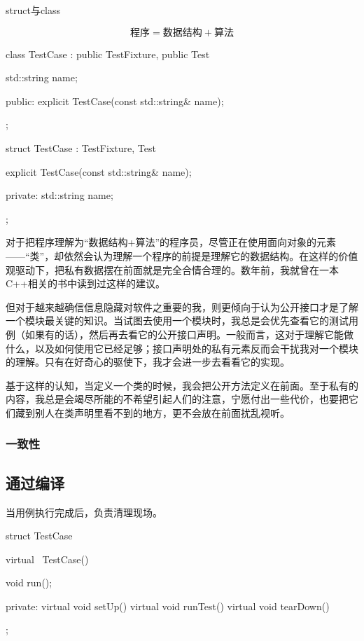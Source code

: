 \begin{content}
\begin{episode}{struct与class}
\begin{content}
\[\text{程序} = \text{数据结构} + \text{算法}\]

\begin{c++}
class TestCase : public TestFixture, public Test {
  std::string name;

public:
  explicit TestCase(const std::string& name);
};

struct TestCase : TestFixture, Test {
  explicit TestCase(const std::string& name);

private:
  std::string name;
};
\end{c++}

对于把程序理解为“数据结构+算法”的程序员，尽管正在使用面向对象的元素——“类”，却依然会认为理解一个程序的前提是理解它的数据结构。在这样的价值观驱动下，把私有数据摆在前面就是完全合情合理的。数年前，我就曾在一本C++相关的书中读到过这样的建议。

但对于越来越确信信息隐藏对软件之重要的我，则更倾向于认为公开接口才是了解一个模块最关键的知识。当试图去使用一个模块时，我总是会优先查看它的测试用例（如果有的话），然后再去看它的公开接口声明。一般而言，这对于理解它能做什么，以及如何使用它已经足够；接口声明处的私有元素反而会干扰我对一个模块的理解。只有在好奇心的驱使下，我才会进一步去看看它的实现。

基于这样的认知，当定义一个类的时候，我会把公开方法定义在前面。至于私有的内容，我总是会竭尽所能的不希望引起人们的注意，宁愿付出一些代价，也要把它们藏到别人在类声明里看不到的地方，更不会放在前面扰乱视听。

\subsubsection{一致性}

\end{content}
\end{episode}

\subsection{通过编译}

当用例执行完成后，负责清理现场。

\begin{leftbar}
 \begin{c++}[caption={\ttfamily{include/mars/core/TestCase.h}}]
struct TestCase {
  virtual ~TestCase() {}

  void run();

private:
  virtual void setUp() {}
  virtual void runTest() {}
  virtual void tearDown() {}
};
  \end{c++}
\end{leftbar}


\end{content}
